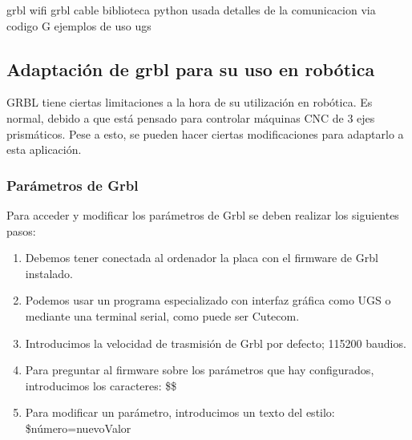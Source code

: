 grbl wifi
grbl cable
biblioteca python usada
detalles de la comunicacion via codigo G
ejemplos de uso ugs 


\subsection{Adaptación de grbl para su uso en robótica}
GRBL tiene ciertas limitaciones a la hora de su utilización en robótica. Es normal, debido a que está pensado para controlar máquinas 
\acs{CNC} de 3 ejes prismáticos. Pese a esto, se pueden hacer ciertas modificaciones para adaptarlo a esta aplicación. 

\subsubsection{Parámetros de Grbl}
Para acceder y modificar los parámetros de Grbl se deben realizar los siguientes pasos:
\begin{enumerate}
\item Debemos tener conectada al ordenador la placa con el firmware de Grbl instalado.
\item Podemos usar un programa especializado con interfaz gráfica como \ac{UGS} o mediante una terminal serial, como puede ser Cutecom.
\item Introducimos la velocidad de trasmisión de Grbl por defecto; 115200 baudios. 
\item Para preguntar al firmware sobre los parámetros que hay configurados, introducimos los caracteres: \$\$
\item Para modificar un parámetro, introducimos un texto del estilo: \$número=nuevoValor
\end{enumerate}

